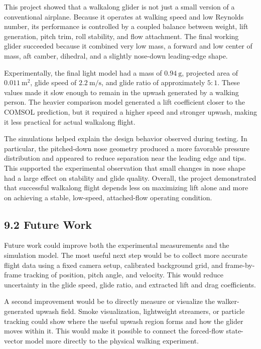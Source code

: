 \documentclass[10pt]{article}
\begin{document}
This project showed that a walkalong glider is not just a small version of a conventional airplane. Because it operates at walking speed and low Reynolds number, its performance is controlled by a coupled balance between weight, lift generation, pitch trim, roll stability, and flow attachment. The final working glider succeeded because it combined very low mass, a forward and low center of mass, aft camber, dihedral, and a slightly nose-down leading-edge shape.

Experimentally, the final light model had a mass of \(0.94~\mathrm{g}\), projected area of \(0.011~\mathrm{m^2}\), glide speed of \(2.2~\mathrm{m/s}\), and glide ratio of approximately \(5:1\). These values made it slow enough to remain in the upwash generated by a walking person. The heavier comparison model generated a lift coefficient closer to the COMSOL prediction, but it required a higher speed and stronger upwash, making it less practical for actual walkalong flight.

The simulations helped explain the design behavior observed during testing. In particular, the pitched-down nose geometry produced a more favorable pressure distribution and appeared to reduce separation near the leading edge and tips. This supported the experimental observation that small changes in nose shape had a large effect on stability and glide quality. Overall, the project demonstrated that successful walkalong flight depends less on maximizing lift alone and more on achieving a stable, low-speed, attached-flow operating condition.

\subsection*{9.2 Future Work}

Future work could improve both the experimental measurements and the simulation model. The most useful next step would be to collect more accurate flight data using a fixed camera setup, calibrated background grid, and frame-by-frame tracking of position, pitch angle, and velocity. This would reduce uncertainty in the glide speed, glide ratio, and extracted lift and drag coefficients.

A second improvement would be to directly measure or visualize the walker-generated upwash field. Smoke visualization, lightweight streamers, or particle tracking could show where the useful upwash region forms and how the glider moves within it. This would make it possible to connect the forced-flow state-vector model more directly to the physical walking experiment.
\end{document}
